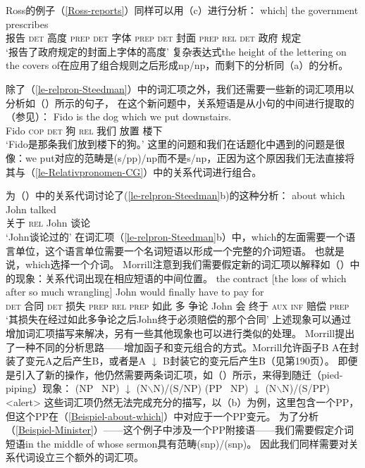 Ross的例子（\ref{Ross-reports}）同样可以用（c）进行分析：
\ea
\gll [reports    [the height of the lettering on the covers of] which] the government prescribes\\
     \spacebr{}报告 \spacebr\textsc{det} 高度 \textsc{prep} \textsc{det} 字体 \textsc{prep} \textsc{det} 封面 \textsc{prep} \textsc{rel} \textsc{det} 政府 规定\\
\glt `报告了政府规定的封面上字体的高度'
\z
复杂表达式the height of the lettering on the covers of在应用了组合规则之后形成np/np，而剩下的分析同（a）的分析。

除了（\ref{le-relpron-Steedman}）中的词汇项之外，我们还需要一些新的词汇项用以分析如（）所示的句子，
在这个新问题中，关系短语是从小句的中间进行提取的（参见\citealp[]{Pollard88a}）：
\ea
\gll Fido is the dog which we put downstairs. \\
     Fido \textsc{cop} \textsc{det} 狗 \textsc{rel} 我们 放置 楼下 \\
\glt `Fido是那条我们放到楼下的狗。'
\z
这里的问题和我们在话题化中遇到的问题是很像：we put对应的范畴是(s/pp)/np而不是s/np，正因为这个原因我们无法直接将其与（\ref{le-Relativpronomen-CG}）中的关系代词进行组合。

\citet[]{Morrill95a}为（）中的关系代词讨论了(\ref{le-relpron-Steedman}b)的这种分析：
\ea
\label{Beispiel-about-which}
\gll about which John talked \\
     关于 \textsc{rel} John 谈论 \\
\glt `John谈论过的'
\z
在词汇项（\ref{le-relpron-Steedman}b）中，which的左面需要一个语言单位，这个语言单位需要一个名词短语以形成一个完整的介词短语。
也就是说，which选择一个介词。
Morrill注意到我们需要假定新的词汇项以解释如（）中的现象：关系代词出现在相应短语的中间位置。
\ea
\gll the          contract [the                 loss of           which after so much wrangling] John would finally have to pay for \\
     \textsc{det} 合同      \spacebr\textsc{det} 损失 \textsc{prep} \textsc{rel} \textsc{prep} 如此 多 争论 John 会 终于 \textsc{aux} \textsc{inf} 赔偿 \textsc{prep}\\
\glt `其损失在经过如此多争论之后John终于必须赔偿的那个合同'
\z
上述现象可以通过增加词汇项描写来解决，另有一些其他现象也可以进行类似的处理。
Morrill提出了一种不同的分析思路——增加函子和变元组合的方式。Morrill允许函子B \up
\isc{$\uparrow$}\is{$\uparrow$} A在封装了变元A之后产生B，或者是A $\downarrow$
\isc{$\downarrow$}\is{$\downarrow$} B封装它的变元后产生B（见第190页）。
即便是引入了新的操作，他仍然需要两条词汇项，如（）所示，来得到随迁（pied-piping）现象：
\eal
\ex (NP \up\ NP) $\downarrow$ (N$\backslash$N)/(S/NP)
\ex (PP \up\ NP) $\downarrow$ (N$\backslash$N)/(S/PP)
\zl
<alert>
这些词汇项仍然无法完成充分的描写，以（b）为例，这里包含一个PP，但这个PP在（\ref{Beispiel-about-which}）中对应于一个PP变元。 
为了分析（\ref{Beispiel-Minister}）——这个例子中涉及一个PP附接语——我们需要假定介词短语in the middle of whose sermon具有范畴(s\bs np)/(s\bs np)。
因此我们同样需要对关系代词设立三个额外的词汇项。

